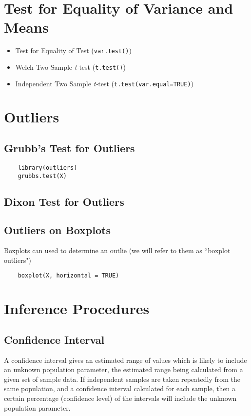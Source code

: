 \documentclass[a4paper,12pt]{article}
\begin{document}
\section{Test for Equality of Variance and Means}

\begin{itemize}
\item Test for Equality of Test (\texttt{var.test()})
\item Welch Two Sample \emph{t-}test (\texttt{t.test()})
\item Independent Two Sample \emph{t-}test (\texttt{t.test(var.equal=TRUE)})

\end{itemize}


\newpage
\section{Outliers}
\subsection{Grubb's Test for Outliers}
\begin{framed}
	\begin{verbatim}
	library(outliers)
	grubbs.test(X)
	\end{verbatim}
\end{framed}
\subsection{Dixon Test for Outliers}
\subsection{Outliers on Boxplots}
Boxplots can used to determine an outlie (we will refer to them as ``boxplot outliers")
\begin{framed}
	\begin{verbatim}
	boxplot(X, horizontal = TRUE)
	\end{verbatim}
\end{framed}

\newpage

\section{Inference Procedures}
\subsection{Confidence Interval }
A confidence interval gives an estimated range of values which is likely to include an unknown population parameter, the estimated range being calculated from a given set of sample data. If independent samples are taken repeatedly from the same population, and a confidence interval calculated for each sample, then a certain percentage (confidence level) of the intervals will include the unknown population parameter. 
\end{document}
